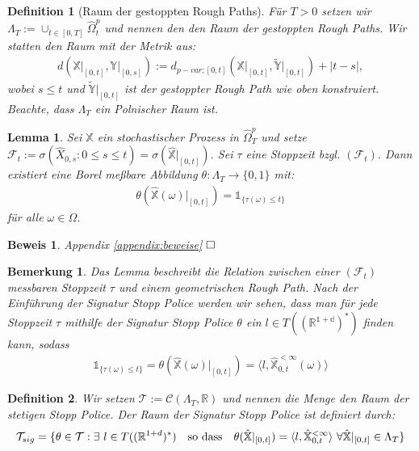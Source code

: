 \documentclass[12pt,titlepage,headsepline]{article}
\newtheorem{definition}{Definition}[section]
\newtheorem{lemma}[theorem]{Lemma}
\newtheorem*{beweis}{Beweis}
\newtheorem*{bemerkung*}{Bemerkung}
\begin{document}
      \begin{definition}[Raum der gestoppten Rough Paths]\label{gestoppte_RP}
        Für $T>0$ setzen wir $\Lambda_T := \cup_{t \in [0,T]} \hat{\Omega}_t^p$ und nennen den den Raum der gestoppten Rough Paths. Wir statten den Raum mit der Metrik aus:
        \begin{align*}
          d(\mathbb{X}\lvert_{[0,t]},\mathbb{Y}\lvert_{[0,s]}):=d_{p-var;[0,t]}(\mathbb{X}\lvert_{[0,t]},\tilde{\mathbb{Y}}\lvert_{[0,t]}) + \lvert t - s \rvert,
        \end{align*}
        wobei $s\leq t$ und $\tilde{\mathbb{Y}}\lvert_{[0,t]}$ ist der gestoppter Rough Path wie oben konstruiert. Beachte, dass $\Lambda_T$ ein Polnischer Raum ist.
      \end{definition}
      \begin{lemma}\label{lemma: bayer_st_theta}
        Sei $\hat{\mathbb{X}}$ ein stochastischer Prozess in $\hat{\Omega}_T^p$ und setze $\mathcal{F}_t:=\sigma(\hat{X}_{0,s} : 0 \leq s \leq t) = \sigma(\hat{\mathbb{X}}\rvert_{[0,t]})$. Sei $\tau$ eine Stoppzeit bzgl. $(\mathcal{F}_t)$. Dann existiert eine Borel meßbare Abbildung $\theta: \Lambda_T \rightarrow \{0,1\}$ mit:
        \begin{align*}
          \theta(\hat{\mathbb{X}}(\omega)\rvert_{[0,t]})=\mathds{1}_{\{\tau(\omega)\leq t\}}
        \end{align*}
        für alle $\omega \in \Omega$.
      \end{lemma}
      \begin{beweis}
        \textup{
        Appendix \ref{appendix:beweise}
        }
      $\hfill\Box$
      \end{beweis}
      \begin{bemerkung*}
        \textup{
        Das Lemma beschreibt die Relation zwischen einer $(\mathcal{F}_t)$ messbaren Stoppzeit $\tau$ und einem geometrischen Rough Path. Nach der Einführung der Signatur Stopp Police werden wir sehen, dass man für jede Stoppzeit $\tau$ mithilfe der Signatur Stopp Police $\theta$ ein $l \in T((\mathbb{R^{1+d}})^*)$ finden kann, sodass
        \begin{align*}
          \mathds{1}_{\{\tau(\omega)\leq t\}} = \theta(\hat{\mathbb{X}}(\omega)\rvert_{[0,t]}) = \langle l, \hat{\mathbb{X}}^{<\infty}_{0,t}(\omega) \rangle
        \end{align*}
        }
      \end{bemerkung*}
      \begin{definition}\label{def: stopp_police}
        Wir setzen $\mathcal{T}:=\mathcal{C}(\Lambda_T,\mathbb{R})$ und nennen die Menge den Raum der stetigen Stopp Police. Der Raum der Signatur Stopp Police ist definiert durch:
        \begin{align*}
          \mathcal{T}_{sig} = \{ \theta \in \mathcal{T} : \exists \ l \in T((\mathbb{R}^{1+d})^*) \quad \textup{so dass} \quad \theta(\hat{\mathbb{X}}\rvert_{[0,t]})=\langle l, \hat{\mathbb{X}}^{<\infty}_{0,t} \rangle \ \forall \hat{\mathbb{X}}\rvert_{[0,t]} \in \Lambda_T \}
        \end{align*}
      \end{definition}
\end{document}
